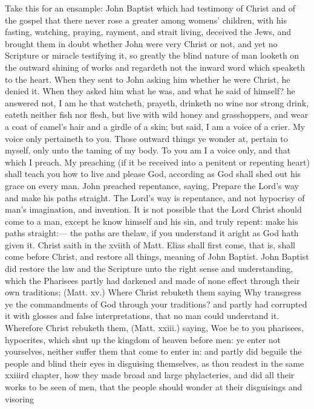 Take this for an ensample: John Baptist which had testimony
of Christ and of the gospel that there never rose a 
greater among womens' children, with his fasting, watching, 
praying, rayment, and strait living, deceived the Jews, 
and brought them in doubt whether John were very Christ 
or not, and yet no Scripture or miracle testifying it, so 
greatly the blind nature of man looketh on the outward 
shining of works and regardeth not the inward word which 
speaketh to the heart. When they sent to John asking him 
whether he were Christ, he denied it. When they asked him 
what he was, and what he said of himself? he answered not, 
I am he that watcheth, prayeth, drinketh no wine nor 
strong drink, eateth neither fish nor flesh, but live with wild 
honey and grasshoppers, and wear a coat of camel's hair and 
a girdle of a skin; but said, I am a voice of a crier. My 
voice only pertaineth to you. Those outward things ye wonder 
at, pertain to myself, only unto the taming of my body. 
To you am I a voice only, and that which I preach. My 
preaching (if it be received into a penitent or repenting heart) 
shall teach you how to live and please God, according as 
God shall shed out his grace on every man. John preached 
repentance, saying, Prepare the Lord's way and make his 
paths straight. The Lord's way is repentance, and not 
hypocrisy of man's imagination, and invention. It is not 
possible that the Lord Christ should come to a man, except 
he know himself and his sin, and truly repent: make his 
paths straight:— the paths are thelaw, if you understand it 
aright as God hath given it. Christ saith in the xviith of 
Matt. Elias shall first come, that is, shall come before 
Christ, and restore all things, meaning of John Baptist. 
John Baptist did restore the law and the Scripture unto the 
right sense and understanding, which the Pharisees partly 
had darkened and made of none effect through their own 
traditions; (Matt. xv.) Where Christ rebuketh them saying 
Why transgress ye the commandments of God through 
your traditions? and partly had corrupted it with glosses 
and false interpretations, that no man could understand it. 
Wherefore Christ rebuketh them, (Matt. xxiii.) saying, Woe 
be to you pharisees, hypocrites, which shut up the kingdom 
of heaven before men: ye enter not yourselves, neither suffer 
them that come to enter in: and partly did beguile the people 
and blind their eyes in disguising themselves, as thou readest 
in the same xxiiird chapter, how they made broad and large 
phylacteries, and did all their works to be seen of men, that 
the people should wonder at their disguisings and visoring 
